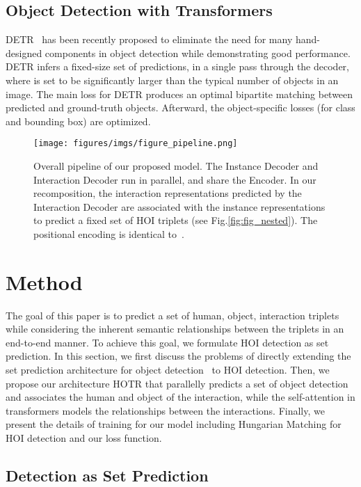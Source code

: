 \documentclass[final]{cvpr}
\begin{document}
\subsection{Object Detection with Transformers}
\label{subsec:DETR}
DETR~\cite{carion2020end} has been recently proposed to eliminate the need for many hand-designed components in object detection while demonstrating good performance.
DETR infers a fixed-size set of  predictions, in a single pass through the decoder, where  is set to be significantly larger than the typical number of objects in an image.
The main loss for DETR produces an optimal bipartite matching between predicted and ground-truth objects.
Afterward, the object-specific losses (for class and bounding box) are optimized. \begin{figure*}
    \centering
    \texttt{[image: figures/imgs/figure\_pipeline.png]}
    \caption{Overall pipeline of our proposed model. The Instance Decoder and Interaction Decoder run in parallel, and share the Encoder. In our recomposition, the interaction representations predicted by the Interaction Decoder are associated with the instance representations to predict a fixed set of HOI triplets (see Fig.\ref{fig:fig_nested}).
The positional encoding is identical to~\cite{carion2020end}.} 
    \label{fig:fig_pipeline}
\end{figure*} \section{Method}
The goal of this paper is to predict a set of human, object, interaction triplets while considering the inherent semantic relationships between the triplets in an end-to-end manner.
To achieve this goal, we formulate HOI detection as set prediction.
In this section, we first discuss the problems of directly extending the set prediction architecture for object detection~\cite{carion2020end} to HOI detection.
Then, we propose our architecture HOTR that parallelly predicts a set of object detection and associates the human and object of the interaction, while the self-attention in transformers models the relationships between the interactions.
Finally, we present the details of training for our model including Hungarian Matching for HOI detection and our loss function.

\subsection{Detection as Set Prediction}
\end{document}
